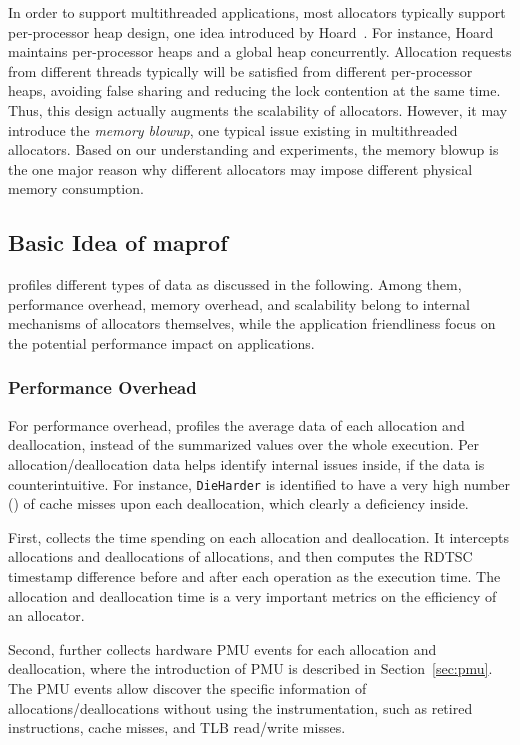 In order to support multithreaded applications, most allocators typically support per-processor heap design, one idea introduced by Hoard~\cite{Hoard}. For instance, Hoard maintains per-processor heaps and a global heap concurrently. Allocation requests from different threads typically will be satisfied from different per-processor heaps, avoiding false sharing and reducing the lock contention at the same time. Thus, this design actually augments the scalability of allocators. However, it may introduce the \textit{memory blowup}, one typical issue existing in multithreaded allocators. Based on our understanding and experiments, the memory blowup is the one major reason why different allocators may impose different physical memory consumption. 

\subsection{Basic Idea of maprof}
\MP{} profiles different types of data as discussed in the following. Among them,  performance overhead, memory overhead, and scalability belong to internal mechanisms of allocators themselves, while the application friendliness focus on the potential performance impact on applications.  
  
\subsubsection{Performance Overhead}

For performance overhead, \MP{} profiles the average data of each allocation and deallocation, instead of the summarized values over the whole execution. Per allocation/deallocation data helps identify internal issues inside, if the data is counterintuitive. For instance, \texttt{DieHarder} is identified to have a very high number () of cache misses upon each deallocation, which clearly a deficiency inside. 

First, \MP{} collects the time spending on each allocation and deallocation. It intercepts allocations and deallocations of allocations, and then computes the RDTSC timestamp difference before and after each operation as the execution time. The allocation and deallocation time is a very important metrics on the efficiency of an allocator.  

% 

Second, \MP{} further collects hardware PMU events for each allocation and deallocation, where the introduction of PMU is described in Section~\ref{sec:pmu}. The PMU events allow \MP{} discover the specific information of allocations/deallocations without using the instrumentation, such as retired instructions, cache misses, and TLB read/write misses. 

